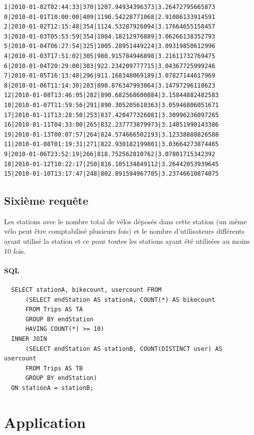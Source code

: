 \documentclass[a4paper]{article}
\begin{document}
    \begin{verbatim}
1|2010-01-02T02:44:33|370|1207.94934396373|3.26472795665873
0|2010-01-01T10:00:00|409|1190.54228771068|2.91086133914591
2|2010-01-02T12:15:48|354|1124.53287926094|3.17664655158457
3|2010-01-03T05:53:59|354|1084.18212976889|3.06266138352793
5|2010-01-04T06:27:54|325|1005.28951449224|3.09319850612996
4|2010-01-03T17:51:02|305|980.915784946898|3.21611732769475
6|2010-01-04T20:29:00|303|922.234209777715|3.04367725999246
7|2010-01-05T16:13:48|296|911.168348069189|3.07827144617969
8|2010-01-06T11:14:30|283|890.876347993064|3.14797296110623
12|2010-01-08T13:46:05|282|890.682568600884|3.15844882482583
10|2010-01-07T11:59:56|291|890.305205610363|3.05946806051671
17|2010-01-11T13:28:50|253|837.420477326081|3.30996236097265
16|2010-01-11T04:33:00|265|832.237773879973|3.14051990143386
19|2010-01-13T00:07:57|264|824.574666502193|3.12338888826588
11|2010-01-08T01:19:31|271|822.930182199801|3.03664273874465
9|2010-01-06T23:52:19|266|818.752562810762|3.07801715342392
18|2010-01-12T10:22:17|250|816.105134849112|3.26442053939645
15|2010-01-10T13:17:47|248|802.891594967705|3.23746610874075
	\end{verbatim}



\subsection{Sixième requête}
	Les stations avec le nombre total de vélos déposés dans cette station (un même vélo peut être comptabilisé plusieurs fois) et le nombre d'utilisateurs différents ayant utilisé la station et ce pour toutes les stations ayant été utilisées au moins 10 fois.

	\paragraph{SQL}
  \begin{verbatim}
  SELECT stationA, bikecount, usercount FROM 
      (SELECT endStation AS stationA, COUNT(*) AS bikecount
      FROM Trips AS TA
      GROUP BY endStation
      HAVING COUNT(*) >= 10)
  INNER JOIN
      (SELECT endStation AS stationB, COUNT(DISTINCT user) AS usercount
      FROM Trips AS TB
      GROUP BY endStation)
  ON stationA = stationB;
  \end{verbatim}




\section{Application}
\end{document}
